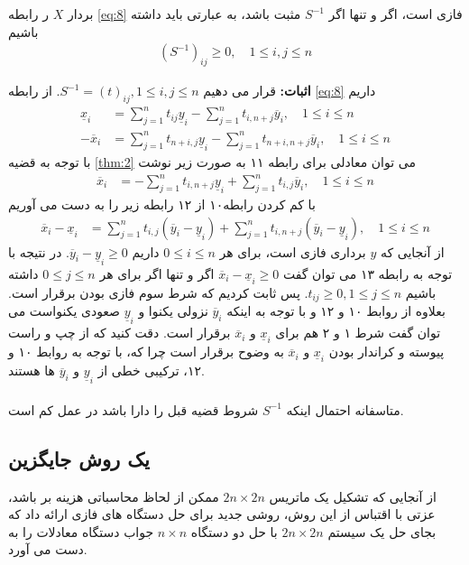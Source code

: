 	\begin{theorem} 
		بردار $ X $ ر رابطه \ref{eq:8} فازی است، ‌اگر و تنها اگر $ S^{-1} $ مثبت باشد، به عبارتی باید داشته باشیم
	\begin{align}
		\left(S^{-1}\right)_{ij} \geq 0, \quad 1 \leq i,j \leq n 
	\end{align}
	\end{theorem}
	\textbf{اثبات:} 
	قرار می دهیم 
	$ .S^{-1} = \left(t\right)_{ij}, 1 \leq i,j \leq n$ 
از رابطه \ref{eq:8} داریم 
 	\begin{align}
		\underline{x}_i & = \sum_{j=1}^n t_{ij}\underline{y}_i - \sum_{j=1}^n t_{i,n+j}\overline{y}_i, \quad 1 \leq i \leq n\\
		-\overline{x}_i & = \sum_{j=1}^n t_{n+i,j}\underline{y}_i - \sum_{j=1}^n t_{n+i,n+j}\overline{y}_i, \quad 1 \leq i \leq n
	\end{align}
	با توجه به قضیه \ref{thm:2} می توان معادلی برای رابطه ۱۱ به صورت زیر نوشت 
	\begin{align}
	\overline{x}_i & = -\sum_{j=1}^n t_{i,n+j}\underline{y}_i + \sum_{j=1}^n t_{i,j}\overline{y}_i, \quad 1 \leq i \leq n
	\end{align}
	با کم کردن رابطه۱۰ از ۱۲ رابطه زیر را به دست می آوریم 
	\begin{align}
	\overline{x}_i - \underline{x}_i & = \sum_{j=1}^n t_{i,j}\left(\overline{y}_i - \underline{y}_i\right) + \sum_{j=1}^n t_{i,n+j}\left(\overline{y}_i - \underline{y}_i\right), \quad 1 \leq i \leq n
	\end{align}
	از آنجایی که $ y $ برداری فازی است،‌ برای هر $ 0 \leq i \leq n $ داریم 
	$ .\overline{y}_i - \underline{y}_i \geq 0$
	در نتیجه با توجه به رابطه ۱۳ می توان گفت 
	$ \overline{x}_i - \underline{x}_i \geq 0$ 
	اگر و تنها اگر برای هر $ 0 \leq j \leq n $ داشته باشیم
	$ .t_{ij} \geq 0, 1 \leq j \leq n $
	پس ثابت کردیم که شرط سوم فازی بودن برقرار است. بعلاوه از روابط ۱۰ و ۱۲ و با توجه به اینکه $ \overline{y}_i $ نزولی یکنوا و 
	$ \underline{y}_i $ صعودی یکنواست 
	می توان گفت شرط ۱ و ۲ هم برای $ \underline{x}_i $ و $ \overline{x}_i $ برقرار است. دقت کنید که از چپ و راست پیوسته و کراندار بودن $ \underline{x}_i $ و $ \overline{x}_i $ به وضوح برقرار است چرا که، با توجه به روابط ۱۰ و ۱۲، ترکیبی خطی از $ \underline{y}_i $ و $ \overline{y}_i $ ها هستند.\\~\\
	متاسفانه احتمال اینکه $ S^{-1} $ شروط قضیه قبل را دارا باشد در عمل کم است. \\
	\subsection{یک روش جایگزین}
	از آنجایی که تشکیل یک ماتریس $ 2n \times 2n $ ممکن از لحاظ محاسباتی هزینه بر باشد،‌ عزتی \cite{ezzati} با اقتباس از این روش،‌ روشی جدید برای حل دستگاه های فازی ارائه داد که بجای حل یک سیستم $ 2n \times 2n $ با حل دو دستگاه $ n \times n $ جواب دستگاه معادلات را به دست می آورد. \\

	